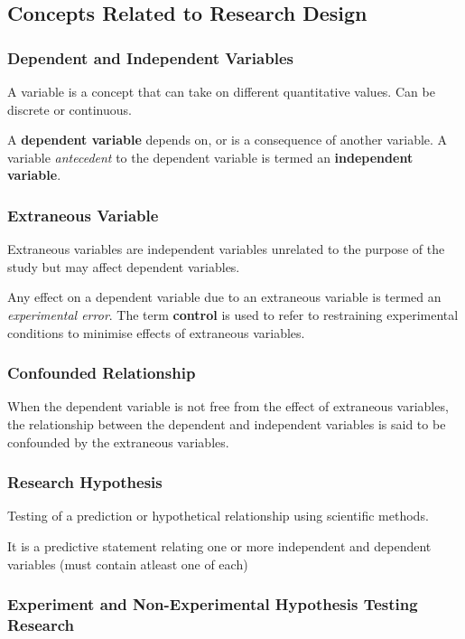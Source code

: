 \documentclass{article}
\begin{document}
\subsection{Concepts Related to Research Design}

\subsubsection{Dependent and Independent Variables}
A variable is a concept that can take on different quantitative values. Can be discrete or continuous.

A \textbf{dependent variable} depends on, or is a consequence of another variable. A variable \textit{antecedent} to the dependent variable is termed an \textbf{independent variable}.

\subsubsection{Extraneous Variable}

Extraneous variables are independent variables unrelated to the purpose of the study but may affect dependent variables. 

Any effect on a dependent variable due to an extraneous variable is termed an \textit{experimental error}. The term \textbf{control} is used to refer to restraining experimental conditions to minimise effects of extraneous variables.

\subsubsection{Confounded Relationship}

When the dependent variable is not free from the effect of extraneous variables, the relationship between the dependent and independent variables is said to be confounded by the extraneous variables.

\subsubsection{Research Hypothesis}

Testing of a prediction or hypothetical relationship using scientific methods.

It is a predictive statement relating one or more independent and dependent variables (must contain atleast one of each)

\subsubsection{Experiment and Non-Experimental Hypothesis Testing Research}
\end{document}
